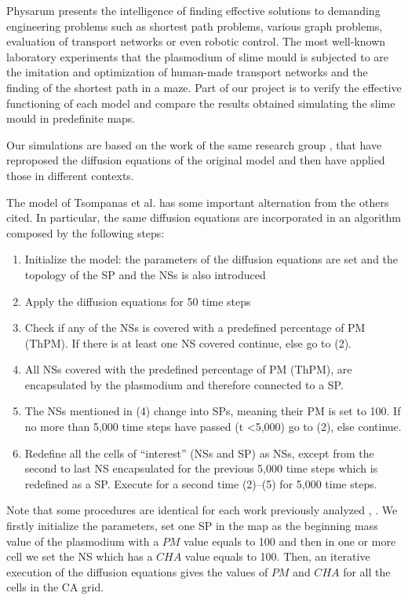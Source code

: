 Physarum presents the intelligence of finding effective solutions to demanding engineering problems such as shortest path problems, various graph problems, evaluation of transport networks or even robotic control.
The most well-known laboratory experiments that the plasmodium of slime mould is subjected to are the imitation and optimization of human-made transport networks and the finding of the shortest path in a maze.
Part of our project is to verify the effective functioning of each model and compare the results obtained simulating the slime mould in predefinite maps.

\par
Our simulations are based on the work of the same research group \cite{dourvas2016gpgpu}, \cite{tsompanas2015cellular} that have reproposed the diffusion equations of the original model \cite{Tsompanas2016} and then have applied those in different contexts.

\par
The model of Tsompanas et al. \cite{Tsompanas2016} has some important alternation from the others cited. In particular, the same diffusion equations are incorporated in an algorithm composed by the following steps:

\begin{enumerate}
	\item Initialize the model: the parameters of the diffusion equations are set and the topology of the SP and the NSs is also introduced
	\item Apply the diffusion equations for 50 time steps
	\item Check if any of the NSs is covered with a predefined percentage of PM (ThPM). If there is at least one NS covered continue, else go to (2).
	\item All NSs covered with the predefined percentage of PM (ThPM), are encapsulated by the plasmodium and therefore connected to a SP.
	\item The NSs mentioned in (4) change into SPs, meaning their PM is set to 100. If no more than 5,000 time steps have passed (t <5,000) go to (2), else continue.
	\item Redefine all the cells of “interest” (NSs and SP) as NSs, except from the second to last NS encapsulated for the previous 5,000 time steps which is redefined as a SP. Execute for a second time (2)–(5) for 5,000 time steps.
\end{enumerate}

Note that some procedures are identical for each work previously analyzed \cite{dourvas2016gpgpu}, \cite{tsompanas2015cellular}. We firstly initialize the parameters, set one SP in the map as the beginning mass value of the plasmodium with a $PM$ value equals to 100 and then in one or more cell we set the NS which has a $CHA$ value equals to 100. Then, an iterative execution of the diffusion equations gives the values of $PM$ and $CHA$ for all the cells in the CA grid.

